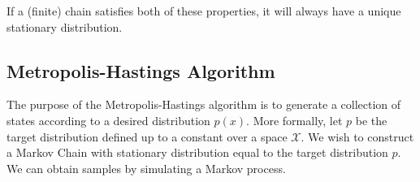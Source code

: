 \documentclass[../main.tex]{subfiles}
\begin{document}
If a (finite) chain satisfies both of these properties, it will always have a
unique stationary distribution.

%
%
%
\subsection{Metropolis-Hastings Algorithm}
The purpose of the Metropolis-Hastings algorithm is to generate a collection of
states according to a desired distribution $p(x)$.
%
More formally, let $p$ be the target distribution defined up to a constant over
a space $\mathcal{X}$.
%
We wish to construct a Markov Chain with stationary distribution equal to the
target distribution $p$.
%
We can obtain samples by simulating a Markov process.
\end{document}
